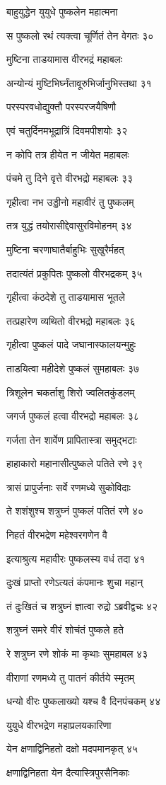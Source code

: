 बाहुयुद्धेन युयुधे पुष्कलेन महात्मना

स पुष्कलो रथं त्यक्त्वा चूर्णितं तेन वेगतः ३०

मुष्टिना ताडयामास वीरभद्रं महाबलः

अन्योन्यं मुष्टिभिर्घ्नंतावूरुभिर्जानुभिस्तथा ३१

परस्परवधोद्युक्तौ परस्परजयैषिणौ

एवं चतुर्दिनमभूद्रात्रिं दिवमपीशयोः ३२

न कोपि तत्र हीयेत न जीयेत महाबलः

पंचमे तु दिने वृत्ते वीरभद्रो महाबलः ३३

गृहीत्वा नभ उड्डीनो महावीरं तु पुष्कलम्

तत्र युद्धं तयोरासीद्देवासुरविमोहनम् ३४

मुष्टिना चरणाघातैर्बाहुभिः सुखुरैर्महत्

तदात्यंतं प्रकुपितः पुष्कलो वीरभद्रकम् ३५

गृहीत्वा कंठदेशे तु ताडयामास भूतले

तत्प्रहारेण व्यथितो वीरभद्रो महाबलः ३६

गृहीत्वा पुष्कलं पादे जघानास्फालयन्मुहुः

ताडयित्वा महीदेशे पुष्कलं सुमहाबलः ३७

त्रिशूलेन चकर्ताशु शिरो ज्वलितकुंडलम्

जगर्ज पुष्कलं हत्वा वीरभद्रो महाबलः ३८

गर्जता तेन शार्वेण प्रापितास्त्रा समुद्भटाः

हाहाकारो महानासीत्पुष्कले पतिते रणे ३९

त्रासं प्रापुर्जनाः सर्वे रणमध्ये सुकोविदाः

ते शशंशुश्च शत्रुघ्नं पुष्कलं पतितं रणे ४०

निहतं वीरभद्रेण महेश्वरगणेन वै

इत्याश्रुत्य महावीरः पुष्कलस्य वधं तदा ४१

दुःखं प्राप्तो रणेऽत्यतं कंपमानः शुचा महान्

तं दुःखितं च शत्रुघ्नं ज्ञात्वा रुद्रो ऽब्रवीद्वचः ४२

शत्रुघ्नं समरे वीरं शोचंतं पुष्कले हते

रे शत्रुघ्न रणे शोकं मा कृथाः सुमहाबल ४३

वीराणां रणमध्ये तु पातनं कीर्तये स्मृतम्

धन्यो वीरः पुष्कलाख्यो यश्च वै दिनपंचकम् ४४

युयुधे वीरभद्रेण महाप्रलयकारिणा

येन क्षणाद्विनिहतो दक्षो मदपमानकृत् ४५

क्षणाद्विनिहता येन दैत्यास्त्रिपुरसैनिकाः

